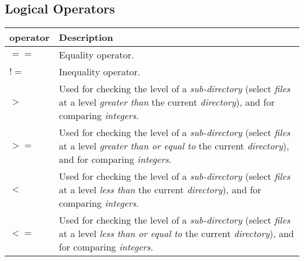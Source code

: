 \documentclass[11pt]{article}
\begin{document}
\subsection{Logical Operators}

\begin{table}[ht]
  \centering
  \vspace{0.5em}
  \begin{tabular}{|m{8em}|b{34em}|}
  \hline

  \textbf{operator}
  &
  \vspace{0.7em}
  \textbf{Description} \\ [0.7em]
  \hline

  $==$
  &
  \vspace{0.7em}
  Equality operator.
  \\[0.7em]
  \hline

  $!=$
  &
  \vspace{0.7em}
  Inequality operator.
  \\[0.7em]
  \hline

  \vspace{-0.9em}
  $>$
  &
  \vspace{0.7em}
  Used for checking the level of a \emph{sub-directory} (select \emph{files} at a level \emph{greater than} the current \emph{directory}), and for comparing \emph{integers}.
  \\[0.7em]
  \hline

  \vspace{-0.9em}
  $>=$
  &
  \vspace{0.7em}
  Used for checking the level of a \emph{sub-directory} (select \emph{files} at a level \emph{greater than or equal to} the current \emph{directory}), and for comparing \emph{integers}.
  \\[0.7em]
  \hline

  \vspace{-0.9em}
  $<$
  &
  \vspace{0.7em}
  Used for checking the level of a \emph{sub-directory} (select \emph{files} at a level \emph{less than} the current \emph{directory}), and for comparing \emph{integers}.
  \\[0.7em]
  \hline

  \vspace{-0.9em}
  $<=$
  &
  \vspace{0.7em}
  Used for checking the level of a \emph{sub-directory} (select \emph{files} at a level \emph{less than or equal to} the current \emph{directory}), and for comparing \emph{integers}.
  \\[0.7em]
  \hline

  \end{tabular}
\end{table}
\end{document}
